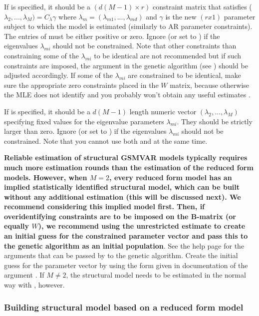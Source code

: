 \documentclass[nojss]{jss}
\begin{document}
If  is specified, it should be a $(d(M-1) \times r)$ constraint matrix that satisfies ($\lambda_{2},...,\lambda_{M}) =C_{\lambda} \gamma$ where $\lambda_{m}=(\lambda_{m1},...,\lambda_{md})$ and $\gamma$ is the new $(r x 1)$ parameter subject to which the model is estimated (similarly to AR parameter constraints). The entries of  must be either positive or zero.  Ignore (or set to ) if the eigenvalues $\lambda_{mi}$ should not be constrained. Note that other constraints than constraining some of the $\lambda_{mi}$ to be identical are not recommended but if such constraints are imposed, the argument  in the genetic algorithm (see ) should be adjusted accordingly. If some of the $\lambda_{mi}$ are constrained to be identical, make sure the appropriate zero constraints placed in the $W$ matrix, because otherwise the MLE does not identify and you probably won't obtain any useful estimates \citep[see][Proposition 2]{Virolainen:2024}.

If  is specified, it should be a $d(M-1)$ length numeric vector $(\lambda_{2},...,\lambda_{M})$ specifying fixed values for the eigenvalue parameters $\lambda_{mi}$. They should be strictly larger than zero. Ignore (or set to ) if the eigenvalues $\lambda_{mi}$ should not be constrained. Note that you cannot use both  and  at the same time.

\textbf{Reliable estimation of structural GSMVAR models typically requires much more estimation rounds than the estimation of the reduced form models. However, when $M=2$, every reduced form model has an implied statistically identified structural model, which can be built without any additional estimation (this will be discussed next). We recommend considering this implied model first. Then, if overidentifying constraints are to be imposed on the B-matrix (or equally $W$), we recommend using the unrestricted estimate to create an initial guess for the constrained parameter vector and pass this to the genetic algorithm as an initial population}. See the help page  for the arguments that can be passed by  to the genetic algorithm. Create the initial guess for the parameter vector by using the form given in documentation of the argument . If $M\neq 2$, the structural model needs to be estimated in the normal way with , however.

\subsubsection{Building structural model based on a reduced form model}
\end{document}
